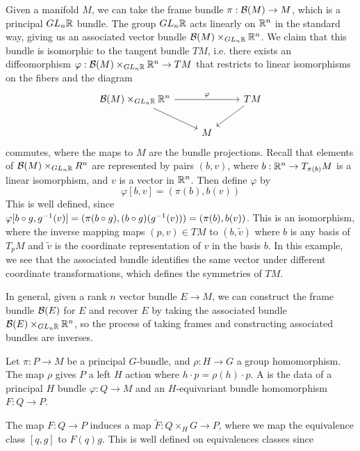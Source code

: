 \begin{exmp}
Given a manifold $M$, we can take the frame bundle $\pi : \mathcal{B}(M) \to M$, which is a
principal $GL_n\mathbb{R}$ bundle. The group $GL_n\mathbb{R}$ acts linearly on $\mathbb{R}^n$ in the
standard way, giving us an associated vector bundle $\mathcal{B}(M) \times_{GL_n\mathbb{R}} \mathbb{R}^n$.
We claim that this bundle is isomorphic to the tangent bundle $TM$, i.e. there
exists an diffeomorphism $\varphi : \mathcal{B}(M) \times_{GL_n\mathbb{R}} \mathbb{R}^n \to TM$ that
restricts to linear isomorphisms on the fibers and the diagram
\[\begin{tikzcd}
\B(M) \times_{GL_n\R} \R^n \ar[rr, "\varphi"] \ar[dr] && TM \ar[dl] \\
& M
\end{tikzcd}\]
commutes, where the maps to $M$ are the bundle projections. Recall that
elements of $\mathcal{B}(M) \times_{GL_n\mathbb{R}} R^n$ are represented by pairs $(b, v)$,
where $b: \mathbb{R}^n \to T_{\pi(b)}M$ is a linear isomorphism, and $v$ is a vector in $\mathbb{R}^n$.
Then define $\varphi$ by
\[
\varphi[b,v] = (\pi(b), b(v))
\]
This is well defined, since $\varphi[b\circ g, g^{-1}(v)] = (\pi(b \circ g),
(b\circ g)(g^{-1}(v))) = (\pi(b), b(v))$. This is an isomorphism, where the
inverse mapping maps $(p,v) \in TM$ to $(b, \tilde{v})$ where $b$ is any
basis of $T_pM$ and $\tilde{v}$ is the coordinate representation of $v$ in the
basis $b$. In this example, we see that the associated bundle identifies the same vector
under different coordinate transformations, which defines the symmetries of
$TM$.
\end{exmp}
%
In general, given a rank $n$ vector bundle $E \to M$, we can construct the
frame bundle  $\mathcal{B}(E)$ for $E$ and recover $E$ by taking the associated bundle
$\mathcal{B}(E) \times_{GL_n\mathbb{R}} \mathbb{R}^n$, so the process of taking frames and constructing
associated bundles are inverses.
%
\begin{defn}
Let $\pi : P \to M$ be a principal $G$-bundle, and $\rho : H \to G$ a group
homomorphism. The map $\rho$ gives $P$ a left $H$ action where
$h \cdot p = \rho(h) \cdot p$. A  is the
data of a principal $H$ bundle $\varphi : Q \to M$ and an $H$-equivariant bundle
homomorphism $F : Q \to P$.
\end{defn}
%
The map $F : Q \to P$ induces a map $\tilde{F} : Q \times_H G \to P$, where we
map the equivalence class $[q,g]$ to $F(q) g$. This is well defined
on equivalences classes since

